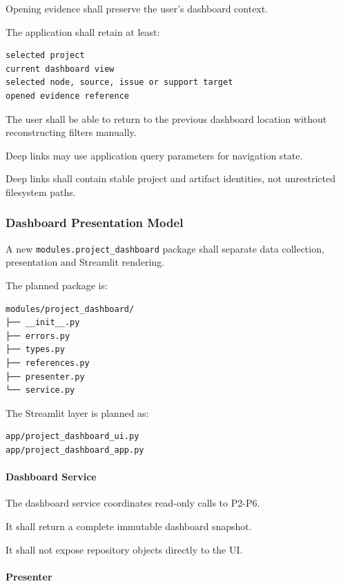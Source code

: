 Opening evidence shall preserve the user's dashboard context.

The application shall retain at least:

\begin{verbatim}
selected project
current dashboard view
selected node, source, issue or support target
opened evidence reference
\end{verbatim}

The user shall be able to return to the previous dashboard location without reconstructing filters manually.

Deep links may use application query parameters for navigation state.

Deep links shall contain stable project and artifact identities, not unrestricted filesystem paths.

\hypertarget{dashboard-presentation-model}{%
\subsubsection{Dashboard Presentation Model}\label{dashboard-presentation-model}}

A new \texttt{modules.project\_dashboard} package shall separate data collection, presentation and Streamlit rendering.

The planned package is:

\begin{verbatim}
modules/project_dashboard/
├── __init__.py
├── errors.py
├── types.py
├── references.py
├── presenter.py
└── service.py
\end{verbatim}

The Streamlit layer is planned as:

\begin{verbatim}
app/project_dashboard_ui.py
app/project_dashboard_app.py
\end{verbatim}

\hypertarget{dashboard-service}{%
\paragraph{Dashboard Service}\label{dashboard-service}}

The dashboard service coordinates read-only calls to P2-P6.

It shall return a complete immutable dashboard snapshot.

It shall not expose repository objects directly to the UI.

\hypertarget{presenter}{%
\paragraph{Presenter}\label{presenter}}

